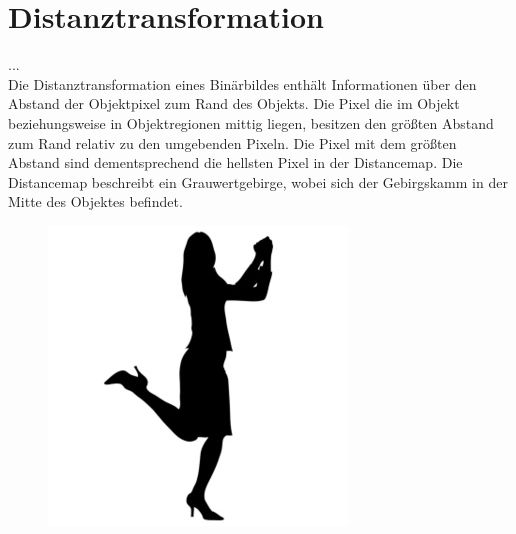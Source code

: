 \section{Distanztransformation}
...\\
Die Distanztransformation eines Binärbildes enthält Informationen über den Abstand der Objektpixel zum Rand des Objekts. Die
Pixel die im Objekt beziehungsweise in Objektregionen mittig liegen, besitzen den größten Abstand zum Rand relativ zu den 
umgebenden Pixeln. Die Pixel mit dem größten Abstand sind dementsprechend die hellsten Pixel in der Distancemap. 
Die Distancemap beschreibt ein Grauwertgebirge, wobei sich der Gebirgskamm in der Mitte des Objektes befindet.
\label{sec:distanztransformation}
\begin{figure}[h]
	\centering
	\begin{minipage}{5cm}
		\centering
		\includegraphics[width=1.0\linewidth]{./fig/person.jpg}
		\label{fig:beispiel_person}
	\end{minipage}
	\hspace{3cm}
	\begin{minipage}{5cm}
		\centering

\end{minipage}
\end{figure}
